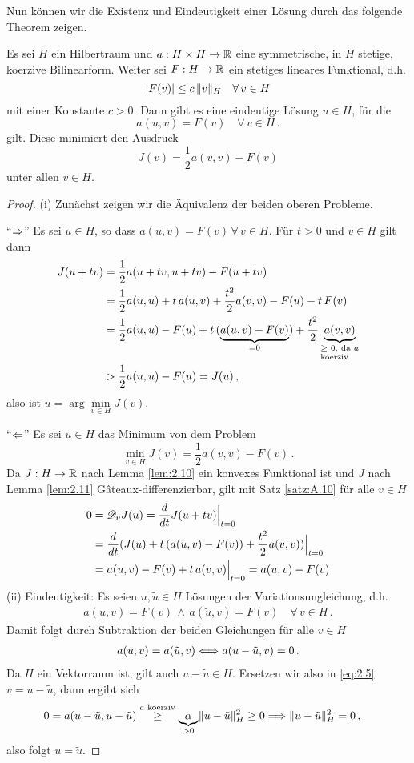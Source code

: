 Nun können wir die Existenz und Eindeutigkeit einer Lösung durch das folgende Theorem zeigen.

\begin{theorem}\label{theorem:2.12}
Es sei $H$ ein Hilbertraum und  $a : H \times H \rightarrow \mathbb{R}$ eine symmetrische, in $H$ stetige, koerzive Bilinearform. Weiter sei $F:H\rightarrow \mathbb{R}$ ein stetiges lineares Funktional, d.h.
\[
	\lvert F(v)\rvert \le c \, \lVert v\rVert_H \quad \forall \, v \in H
\]
mit einer Konstante $c >0$. Dann gibt es eine eindeutige Lösung $u \in H$, für die
\[
	a(u,v) = F(v) \quad \forall \, v \in H \, .
\]
gilt. Diese minimiert den Ausdruck
\[
	J(v) = \frac 1 2 a(v,v) - F(v)
\]
unter allen $v \in H$.
\end{theorem}

\begin{proof}
(i) Zunächst zeigen wir die Äquivalenz der beiden oberen Probleme.

"`$\Rightarrow$"' Es sei $u\in H$, so dass $a(u,v) = F(v) \, \forall \, v \in H$. Für $t>0$ und $v\in H$ gilt dann
\begin{align*}
	J(u+tv) & = \frac 1 2 a(u+tv,u+tv) -F(u+tv) \\
	& = \frac 1 2 a(u,u) + t \, a(u,v) + \frac {t^2} 2 a(v,v)-F(u)-t \, F(v) \\
	& = \frac 1 2 a(u,u)-F(u) + t\, (\underbrace{a(u,v)-F(v)}_{=0}) + \frac{t^2}2 \underbrace{a(v,v)}_{\parbox{1.2cm}{\scriptsize$\ge 0$, da $a$ koerziv}} \\
	& > \frac 1 2 a(u,u) - F(u) = J(u) \, ,
\end{align*}
also ist $u = \arg\min\limits_{v\in H} J(v)$.

"`$\Leftarrow$"' Es sei $u \in H$ das Minimum von dem Problem
\[
	\min_{v\in H} J(v) = \frac 1 2 a(v,v) -F(v) \, .
\]
Da $J:H\rightarrow \mathbb{R}$ nach Lemma \ref{lem:2.10} ein konvexes Funktional ist und $J$ nach Lemma \ref{lem:2.11} Gâteaux-differenzierbar, gilt mit Satz \ref{satz:A.10} für alle $v \in H$
\begin{align*}
	0& = \mathscr D_vJ(u) = \frac d{dt} J(u+tv)\Big|_{t=0} \\
	& = \frac d{dt}(J(u) + t \, (a(u,v)-F(v))+\frac{t^2}2 a(v,v))\Big|_{t=0} \\
	& = a(u,v)-F(v) + t \, a(v,v) \Big|_{t=0} = a(u,v)-F(v)
\end{align*}
(ii) Eindeutigkeit: Es seien $u,\tilde u \in H$ Lösungen der Variationsungleichung, d.h.
\begin{align*}
	a(u,v) = F(v) \, \wedge \, a(\tilde u,v) = F(v) \quad \forall \, v \in H \, .
\end{align*}
Damit folgt durch Subtraktion der beiden Gleichungen für alle $v \in H$
\begin{align}\label{eq:2.5}
	a(u,v) = a(\tilde u,v) \Longleftrightarrow a(u-\tilde u,v) = 0 \, .
\end{align}
Da $H$ ein Vektorraum ist, gilt auch $u-\tilde u \in H$. Ersetzen wir also in \eqref{eq:2.5} $v = u-\tilde u$, dann ergibt sich
\begin{align*}
	&0 = a(u-\tilde u,u-\tilde u) \stackrel{\scriptsize a\text{ koerziv}}\ge \underbrace{\alpha}_{>0} \lVert u-\tilde u\rVert_H^2 \ge 0 
	\Longrightarrow\lVert u-\tilde u\rVert_H^2 = 0 \, ,
\end{align*}
also folgt $u = \tilde u$.


\end{proof}
